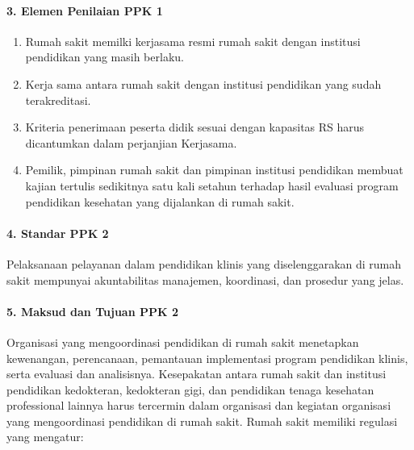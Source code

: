\documentclass[
]{book}
\providecommand{\tightlist}{%
  \setlength{\itemsep}{0pt}\setlength{\parskip}{0pt}}
\begin{document}
\hypertarget{elemen-penilaian-ppk-1}{%
\paragraph*{3. Elemen Penilaian PPK 1}\label{elemen-penilaian-ppk-1}}

\begin{enumerate}
\def\labelenumi{\alph{enumi}.}
\tightlist
\item
  Rumah sakit memilki kerjasama resmi rumah sakit dengan institusi pendidikan yang masih berlaku.
\item
  Kerja sama antara rumah sakit dengan institusi pendidikan yang sudah terakreditasi.
\item
  Kriteria penerimaan peserta didik sesuai dengan kapasitas RS harus dicantumkan dalam perjanjian Kerjasama.
\item
  Pemilik, pimpinan rumah sakit dan pimpinan institusi pendidikan membuat kajian tertulis sedikitnya satu kali setahun terhadap hasil evaluasi program pendidikan kesehatan yang dijalankan di rumah sakit.
\end{enumerate}

\hypertarget{standar-ppk-2}{%
\paragraph*{4. Standar PPK 2}\label{standar-ppk-2}}

Pelaksanaan pelayanan dalam pendidikan klinis yang diselenggarakan di rumah sakit mempunyai akuntabilitas manajemen, koordinasi, dan prosedur yang jelas.

\hypertarget{maksud-dan-tujuan-ppk-2}{%
\paragraph*{5. Maksud dan Tujuan PPK 2}\label{maksud-dan-tujuan-ppk-2}}

Organisasi yang mengoordinasi pendidikan di rumah sakit menetapkan kewenangan, perencanaan, pemantauan implementasi program pendidikan klinis, serta evaluasi dan analisisnya.
Kesepakatan antara rumah sakit dan institusi pendidikan kedokteran, kedokteran gigi, dan pendidikan tenaga kesehatan professional lainnya harus tercermin dalam organisasi dan kegiatan organisasi yang mengoordinasi pendidikan di rumah sakit.
Rumah sakit memiliki regulasi yang mengatur:
\end{document}
